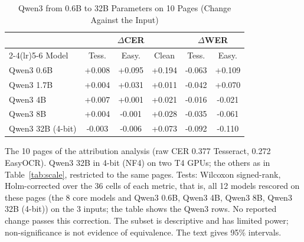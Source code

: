 \begin{table}[t]
\centering
\caption{Qwen3 from 0.6B to 32B Parameters on 10 Pages (Change Against the Input)}
\label{tab:large}
\setlength{\tabcolsep}{3pt}
\footnotesize
\begin{tabular}{lccccc}
\toprule
 & \multicolumn{3}{c}{$\Delta$CER} & \multicolumn{2}{c}{$\Delta$WER} \\
\cmidrule(lr){2-4}\cmidrule(lr){5-6}
Model & Tess. & Easy. & Clean & Tess. & Easy. \\
\midrule
Qwen3 0.6B & +0.008 & +0.095 & +0.194 & -0.063 & +0.109 \\
Qwen3 1.7B & +0.004 & +0.031 & +0.011 & -0.042 & +0.070 \\
Qwen3 4B & +0.007 & +0.001 & +0.021 & -0.016 & -0.021 \\
Qwen3 8B & +0.004 & -0.001 & +0.028 & -0.035 & -0.061 \\
Qwen3 32B (4-bit) & -0.003 & -0.006 & +0.073 & -0.092 & -0.110 \\
\bottomrule
\end{tabular}
\par\smallskip
\begin{minipage}{\linewidth}\footnotesize The 10 pages of the attribution analysis (raw CER 0.377 Tesseract, 0.272 EasyOCR). Qwen3 32B in 4-bit (NF4) on two T4 GPUs; the others as in Table~\ref{tab:scale}, restricted to the same pages. Tests: Wilcoxon signed-rank, Holm-corrected over the 36 cells of each metric, that is, all 12 models rescored on these pages (the 8 core models and Qwen3 0.6B, Qwen3 4B, Qwen3 8B, Qwen3 32B (4-bit)) on the 3 inputs; the table shows the Qwen3 rows. No reported change passes this correction. The subset is descriptive and has limited power; non-significance is not evidence of equivalence. The text gives 95\% intervals.\end{minipage}
\end{table}
